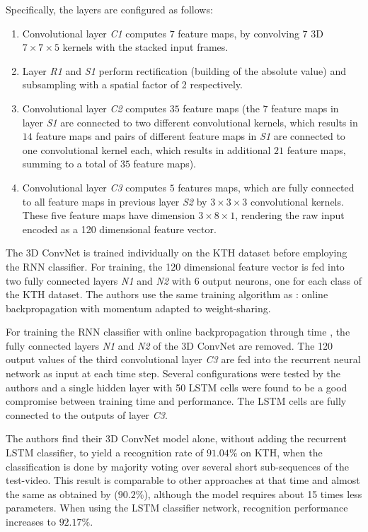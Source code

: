 Specifically, the layers are configured as follows:
\begin{enumerate}
    \item Convolutional layer \textit{C1} computes $7$ feature maps, by convolving $7$ 3D $7\times7\times5$ kernels with the stacked input frames.
    \item Layer \textit{R1} and \textit{S1} perform rectification (building of the absolute value) and subsampling with a spatial factor of 2 respectively.
    \item Convolutional layer \textit{C2} computes $35$ feature maps (the $7$ feature maps in layer \textit{S1} are connected to two different convolutional kernels, which results in $14$ feature maps and pairs of different feature maps in \textit{S1} are connected to one convolutional kernel each, which results in additional $21$ feature maps, summing to a total of $35$ feature maps).
    \item Convolutional layer \textit{C3} computes $5$ features maps, which are fully connected to all feature maps in previous layer \textit{S2} by $3\times3\times3$ convolutional kernels. These five feature maps have dimension $3\times8\times1$, rendering the raw input encoded as a 120 dimensional feature vector.
\end{enumerate}

The 3D ConvNet is trained individually on the KTH dataset before employing the RNN classifier.
For training, the 120 dimensional feature vector is fed into two fully connected layers \textit{N1} and \textit{N2} with 6 output neurons, one for each class of the KTH dataset.
The authors use the same training algorithm as \textcite{ji_3d_2013}: online backpropagation with momentum adapted to weight-sharing.

For training the RNN classifier with online backpropagation through time \cite{gers_learning_2002}, the fully connected layers \textit{N1} and \textit{N2} of the 3D ConvNet are removed.
The 120 output values of the third convolutional layer \textit{C3} are fed into the recurrent neural network as input at each time step.
Several configurations were tested by the authors and a single hidden layer with 50 LSTM cells were found to be a good compromise between training time and performance.
The LSTM cells are fully connected to the outputs of layer \textit{C3}.

The authors find their 3D ConvNet model alone, without adding the recurrent LSTM classifier, to yield a recognition rate of $91.04\%$ on KTH, when the classification is done by majority voting over several short sub-sequences of the test-video.
This result is comparable to other approaches at that time and almost the same as obtained by \textcite{ji_3d_2013} ($90.2\%$), although the model requires about 15 times less parameters.
When using the LSTM classifier network, recognition performance increases to $92.17\%$.


